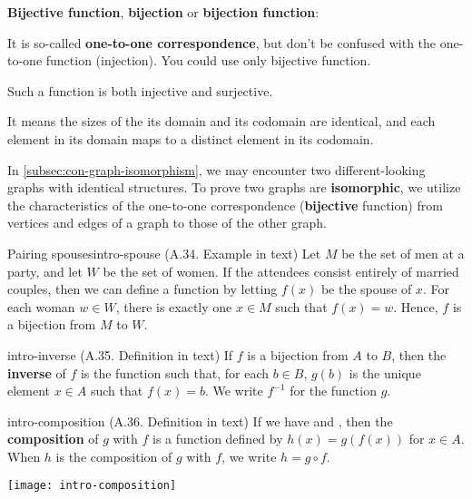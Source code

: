\documentclass[../src/handouts/main.tex]{subfiles}
\begin{document}
\vspace{.5em}
\textbf{Bijective function}, \textbf{bijection} or \textbf{bijection function}:
\begin{enumerate*}
  \item It is so-called \textbf{one-to-one correspondence}, but don't be confused with the one-to-one function (injection). You could use only bijective function.
  \item Such a function is both injective and surjective.
  \item It means the sizes of the its domain and its codomain are identical, and each element in its domain maps to a distinct element in its codomain.
  \item In \cref{subsec:con-graph-isomorphism}, we may encounter two different-looking graphs with identical structures. To prove two graphs are \textbf{isomorphic}, we utilize the characteristics of the one-to-one correspondence (\textbf{bijective} function) from vertices and edges of a graph to those of the other graph.
\end{enumerate*}
\vspace{1em}

\begin{example}{Pairing spouses}{intro-spouse}
  (A.34. Example in text)
  Let $M$ be the set of men at a party, and let $W$ be the set of women.
  If the attendees consist entirely of married couples, then we can define a function {} by letting $f(x)$ be the spouse of $x$.
  For each woman $w \in W$, there is exactly one $x \in M$ such that $f(x) = w$.
  Hence, $f$ is a bijection from $M$ to $W$.
\end{example}

\begin{definition}{}{intro-inverse}
  (A.35. Definition in text)
  If $f$ is a bijection from $A$ to $B$, then the \textbf{inverse} of $f$ is the function {} such that, for each $b \in B$, $g(b)$ is the unique element $x \in A$ such that $f(x) = b$.
  We write $f^{-1}$ for the function $g$.
\end{definition}

\begin{definition}{}{intro-composition}
  (A.36. Definition in text)
  If we have {} and {}, then the \textbf{composition} of $g$ with $f$ is a function {} defined by $h(x) = g(f(x))$ for $x \in A$.
  When $h$ is the composition of $g$ with $f$, we write $h = g \circ f$.

  \centering
  \texttt{[image: intro-composition]}
\end{definition}
\end{document}
